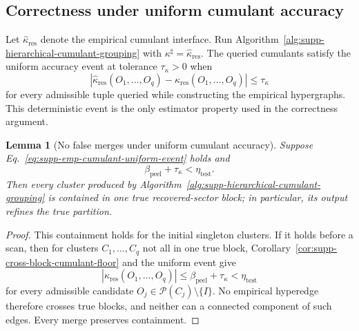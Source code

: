 \documentclass[
  aps,
  prx,
  reprint,
  superscriptaddress,
  amsmath,
  amssymb,
  nofootinbib,
  longbibliography
]{revtex4-2}
\newtheorem{lemma}[theorem]{Lemma}
\begin{document}
\subsection{Correctness under uniform cumulant accuracy}
\label{sec:supp-correctness-empirical-complexity}

Let $\widehat\kappa_{\mathrm{res}}$ denote the empirical cumulant interface.
Run Algorithm~\ref{alg:supp-hierarchical-cumulant-grouping} with
$\kappa^\sharp=\widehat\kappa_{\mathrm{res}}$.  The queried
cumulants satisfy the uniform accuracy event at tolerance
$\tau_\kappa>0$ when
\begin{equation}
\left|
\widehat\kappa_{\mathrm{res}}(O_1,\dots,O_q)
-
\kappa_{\mathrm{res}}(O_1,\dots,O_q)
\right|
\le
\tau_\kappa
\label{eq:supp-emp-cumulant-uniform-event}
\end{equation}
for every admissible tuple queried while constructing the empirical
hypergraphs.  This deterministic event is the only estimator property used
in the correctness argument.

\begin{lemma}[No false merges under uniform cumulant accuracy]
\label{lem:supp-cumulant-no-false-merge}
Suppose Eq.~\eqref{eq:supp-emp-cumulant-uniform-event} holds and
\begin{equation}
\beta_{\mathrm{peel}}+\tau_\kappa<\eta_{\mathrm{test}}.
\end{equation}
Then every cluster produced by
Algorithm~\ref{alg:supp-hierarchical-cumulant-grouping} is contained in one
true recovered-sector block; in particular, its output refines the true
partition.
\end{lemma}

\begin{proof}
This containment holds for the initial singleton clusters.  If it holds
before a scan, then for clusters $C_1,\dots,C_q$ not all in one true block,
Corollary~\ref{cor:supp-cross-block-cumulant-floor} and the uniform event give
\begin{equation}
\left|\widehat\kappa_{\mathrm{res}}(O_1,\dots,O_q)\right|
\le\beta_{\mathrm{peel}}+\tau_\kappa<\eta_{\mathrm{test}}
\end{equation}
for every admissible candidate $O_j\in\mathcal P(C_j)\setminus\{I\}$.
No empirical hyperedge therefore crosses true blocks, and neither can a
connected component of such edges.  Every merge preserves containment.
\end{proof}
\end{document}
